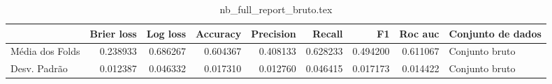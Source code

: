 \begin{table}
\centering
\caption{nb_full_report_bruto.tex}
\label{nb_full_report_bruto.tex}
\begin{tabular}{lrrrrrrrl}
\toprule
{} &  Brier  loss &  Log loss &  Accuracy  &  Precision  &   Recall  &       F1  &  Roc auc  & Conjunto de dados \\
\midrule
Média dos Folds &     0.238933 &  0.686267 &   0.604367 &    0.408133 &  0.628233 &  0.494200 &  0.611067 &    Conjunto bruto \\
Desv. Padrão    &     0.012387 &  0.046332 &   0.017310 &    0.012760 &  0.046415 &  0.017173 &  0.014422 &    Conjunto bruto \\
\bottomrule
\end{tabular}
\end{table}
